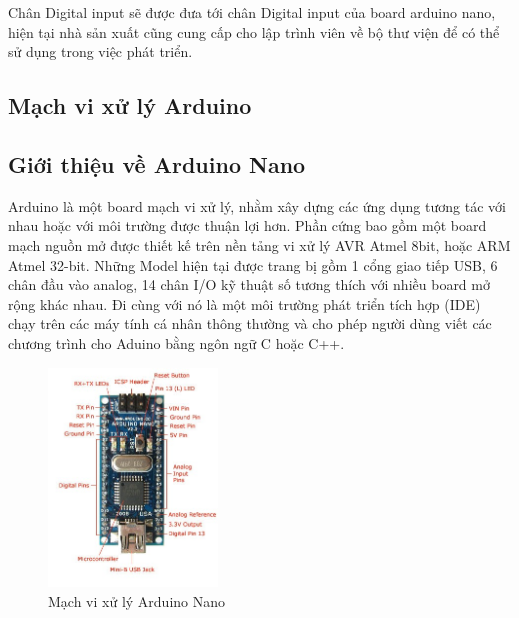 Chân Digital input sẽ được đưa tới chân Digital input của board arduino nano, hiện tại nhà sản xuất cũng cung cấp cho lập trình viên về bộ thư viện để có thể sử dụng trong việc phát triển.

\newpage



\subsection{Mạch vi xử lý Arduino}
\subsection*{Giới thiệu về Arduino Nano}
Arduino là một board mạch vi xử lý, nhằm xây dựng các ứng dụng tương tác với nhau hoặc với môi trường được thuận lợi hơn. Phần cứng bao gồm một board mạch nguồn mở được thiết kế trên nền tảng vi xử lý AVR Atmel 8bit, hoặc ARM Atmel 32-bit. Những Model hiện tại được trang bị gồm 1 cổng giao tiếp USB, 6 chân đầu vào analog, 14 chân I/O kỹ thuật số tương thích với nhiều board mở rộng khác nhau. Đi cùng với nó là một môi trường phát triển tích hợp (IDE) chạy trên các máy tính cá nhân thông thường và cho phép người dùng viết các chương trình cho Aduino bằng ngôn ngữ C hoặc C++.

\begin{center}
\begin{figure}[htp]
\centering    
\includegraphics[width=0.4\textwidth]{arduinonano}
\caption[Mạch vi xử lý Arduino Nano]{Mạch vi xử lý Arduino Nano}
\label{fig:arduinonano}
\end{figure}
\end{center}

\newpage


